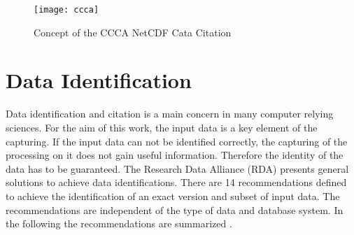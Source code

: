 \documentclass[draft,final]{vutinfth} %
\begin{document}
\begin{figure}[h]
	\centering
	\texttt{[image: ccca]}
	\caption{Concept of the CCCA NetCDF Cata Citation \cite{ccca}}
	\label{fig:ccca} %
\end{figure}

\section{Data Identification}\label{Data Identification}
Data identification and citation is a main concern in many computer relying sciences. For the aim of this work, the input data is a key element of the capturing. If the input data can not be identified correctly, the capturing of the processing on it does not gain useful information. Therefore the identity of the data has to be guaranteed. The Research Data Alliance (RDA) presents general solutions to achieve data identifications. There are 14 recommendations defined to achieve the identification of an exact version and subset of input data. The recommendations are independent of the type of data and database system. In the following the recommendations are summarized \cite{rauber2016identification}.
\end{document}

